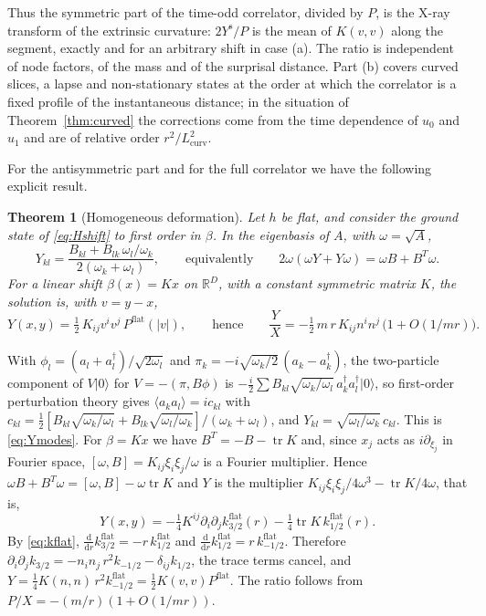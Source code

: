 \documentclass[11pt,a4paper]{article}
\makeatletter
\theoremstyle{stmt}
\newtheorem{theorem}{Theorem}[section]
\theoremstyle{defn}
\theoremstyle{rmk}
\renewenvironment{proof}[1][\proofname]{\par\pushQED{\qed}\normalfont\topsep6\p@\@plus6\p@\relax
  \trivlist\item[\hskip\labelsep{\sffamily\itshape\small #1.}]\ignorespaces}{\popQED\endtrivlist\@endpefalse}
\numberwithin{equation}{section}
\newcommand{\R}{\mathbb{R}}
\newcommand{\dd}{\mathrm{d}}
\newcommand{\Lcurv}{L_{\mathrm{curv}}}
\makeatother
\begin{document}
Thus the symmetric part of the time-odd correlator, divided by $P$, is the X-ray transform of the extrinsic curvature: $2Y^{\mathrm s}/P$ is the mean of $K(v,v)$ along the segment, exactly and for an arbitrary shift in case (a). The ratio is independent of node factors, of the mass and of the surprisal distance. Part (b) covers curved slices, a lapse and non-stationary states at the order at which the correlator is a fixed profile of the instantaneous distance; in the situation of Theorem~\ref{thm:curved} the corrections come from the time dependence of $u_0$ and $u_1$ and are of relative order $r^2/\Lcurv^2$.

For the antisymmetric part and for the full correlator we have the following explicit result.

\begin{theorem}[Homogeneous deformation]\label{thm:YP}
Let $h$ be flat, and consider the ground state of \eqref{eq:Hshift} to first order in $\beta$. In the eigenbasis of $A$, with $\omega=\sqrt A$,
\begin{equation}\label{eq:Ymodes}
Y_{kl}=\frac{B_{kl}+B_{lk}\,\omega_l/\omega_k}{2(\omega_k+\omega_l)},\qquad\text{equivalently}\qquad2\omega(\omega Y+Y\omega)=\omega B+B^{T}\omega .
\end{equation}
For a linear shift $\beta(x)=Kx$ on $\R^D$, with a constant symmetric matrix $K$, the solution is, with $v=y-x$,
\begin{equation}\label{eq:YP}
Y(x,y)=\tfrac12\,K_{ij}v^iv^j\,P^{\mathrm{flat}}(|v|),\qquad\text{hence}\qquad\frac{Y}{X}=-\tfrac12\,m\,r\,K_{ij}n^in^j\,\big(1+O(1/mr)\big).
\end{equation}
\end{theorem}

\begin{proof}
With $\phi_l=(a_l+a_l^\dagger)/\sqrt{2\omega_l}$ and $\pi_k=-i\sqrt{\omega_k/2}\,(a_k-a_k^\dagger)$, the two-particle component of $V|0\rangle$ for $V=-(\pi,B\phi)$ is $-\tfrac i2\sum B_{kl}\sqrt{\omega_k/\omega_l}\,a_k^\dagger a_l^\dagger|0\rangle$, so first-order perturbation theory gives $\langle a_ka_l\rangle=ic_{kl}$ with $c_{kl}=\tfrac12[B_{kl}\sqrt{\omega_k/\omega_l}+B_{lk}\sqrt{\omega_l/\omega_k}]/(\omega_k+\omega_l)$, and $Y_{kl}=\sqrt{\omega_l/\omega_k}\,c_{kl}$. This is \eqref{eq:Ymodes}. For $\beta=Kx$ we have $B^{T}=-B-\operatorname{tr}K$ and, since $x_j$ acts as $i\partial_{\xi_j}$ in Fourier space, $[\omega,B]=K_{ij}\xi_i\xi_j/\omega$ is a Fourier multiplier. Hence $\omega B+B^{T}\omega=[\omega,B]-\omega\operatorname{tr}K$ and $Y$ is the multiplier $K_{ij}\xi_i\xi_j/4\omega^3-\operatorname{tr}K/4\omega$, that is,
\[
Y(x,y)=-\tfrac14K^{ij}\partial_i\partial_jk^{\mathrm{flat}}_{3/2}(r)-\tfrac14\operatorname{tr}K\,k^{\mathrm{flat}}_{1/2}(r).
\]
By \eqref{eq:kflat}, $\tfrac{\dd}{\dd r}k^{\mathrm{flat}}_{3/2}=-r\,k^{\mathrm{flat}}_{1/2}$ and $\tfrac{\dd}{\dd r}k^{\mathrm{flat}}_{1/2}=r\,k^{\mathrm{flat}}_{-1/2}$. Therefore $\partial_i\partial_jk_{3/2}=-n_in_j\,r^2k_{-1/2}-\delta_{ij}k_{1/2}$, the trace terms cancel, and $Y=\tfrac14K(n,n)\,r^2k^{\mathrm{flat}}_{-1/2}=\tfrac12K(v,v)P^{\mathrm{flat}}$. The ratio follows from $P/X=-(m/r)(1+O(1/mr))$.
\end{proof}
\end{document}
